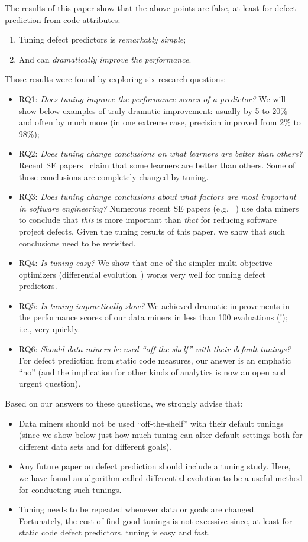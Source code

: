 \documentclass{sig-alternative}
\newcommand{\bi}{\begin{itemize}[leftmargin=0.4cm]}
\newcommand{\ei}{\end{itemize}}
\newcommand{\be}{\begin{enumerate}}
\newcommand{\ee}{\end{enumerate}}
\begin{document}
The results of this paper show that the above points are
false,  at least for
defect prediction from  code attributes:
\be
\item
Tuning  defect predictors is {\em remarkably simple};
\item
And can {\em dramatically improve the performance}. 
\ee
Those results were found by   exploring six research questions:
\bi
\item RQ1: {\em Does   tuning    improve the performance scores of a predictor?} We will show below
 examples of truly dramatic improvement:
 usually by 5 to 20\% and often by much more (in one extreme case, precision improved from 2\% to 98\%);
\item RQ2: {\em Does tuning change conclusions on what learners are better than others?} 
Recent SE papers~\cite{lessmann2008benchmarking,hall11} claim that some learners are better than others. 
Some of those conclusions are completely changed by tuning. 
\item RQ3: {\em Does tuning change conclusions about what factors are most important in software engineering?} Numerous recent SE papers (e.g. ~\cite{bell2013limited,rahman2013how,me02k,Moser:2008,zimmermann2007predicting,%
herzig2013predicting}) use data miners to conclude that {\em this}
is more important than {\em that} for reducing software project defects.
Given the  tuning results of this paper, we show that such conclusions need to be revisited.
\item  RQ4: {\em Is tuning easy?} We show that one of the simpler multi-objective optimizers
(differential evolution~\cite{storn1997differential}) works very well for tuning defect predictors. 
\item RQ5: {\em Is tuning impractically slow?} We achieved dramatic improvements in the performance scores
of our data miners in less than 100 evaluations (!); i.e., very
quickly.
\item RQ6: {\em Should data miners be used ``off-the-shelf'' with their default tunings?} 
For defect prediction from static code measures, our answer is an emphatic ``no'' (and
the implication for other kinds of  analytics is now an open and urgent question).
\ei
Based on our answers to these  questions,  we strongly advise that:
\bi
\item
Data miners should not be used ``off-the-shelf'' with their default tunings (since
we show below just how much tuning can alter default settings
both for different data sets and for different goals).
\item
Any future paper on defect prediction should include a 
tuning study. Here, we have found  an algorithm called differential
evolution to be a useful method for conducting such
tunings.
\item
Tuning needs to be repeated
whenever data or goals are changed.
Fortunately, the cost of find good tunings is not excessive since, at least for
static code defect predictors, tuning is easy and fast.
\ei
\end{document}
